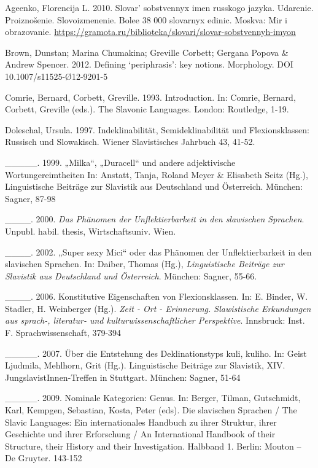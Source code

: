 \documentclass[output=paper]{langscibook}
\begin{document}
Ageenko, Florencija L. 2010. Slovar’ sobstvennyx imen russkogo jazyka. Udarenie. Proiznošenie. Slovoizmenenie. Bolee 38 000 slovarnyx edinic. Moskva: Mir i obrazovanie. \url{https://gramota.ru/biblioteka/slovari/slovar-sobstvennyh-imyon} 

Brown, Dunstan;  Marina  Chumakina;  Greville  Corbett;  Gergana  Popova  \& Andrew Spencer. 2012. Defining ‘periphrasis’: key notions. Morphology.  DOI 10.1007/s11525-Ø12-9201-5 

Comrie, Bernard, Corbett, Greville. 1993. Introduction. In: Comrie, Bernard, Corbett, Greville (eds.). The Slavonic Languages. London: Routledge, 1-19.

Doleschal, Ursula. 1997. Indeklinabilität, Semideklinabilität und Flexionsklassen: Russisch und Slowakisch. Wiener Slavistisches Jahrbuch 43, 41-52.

\_\_\_\_\_. 1999. „Milka“, „Duracell“ und andere adjektivische Wortungereimtheiten In: Anstatt, Tanja, Roland Meyer \& Elisabeth Seitz (Hg.), Linguistische Beiträge zur Slavistik aus Deutschland und Österreich. München: Sagner, 87-98

\_\_\_\_. 2000. \textit{Das Phänomen der Unflektierbarkeit in den slawischen Sprachen}. Unpubl. habil. thesis, Wirtschaftsuniv. Wien.

\_\_\_\_. 2002. „Super sexy Mici“ oder das Phänomen der Unflektierbarkeit in den slavischen Sprachen. In: Daiber, Thomas (Hg.), \textit{Linguistische Beiträge zur Slavistik aus Deutschland und Österreich}. München: Sagner, 55-66.

\_\_\_\_. 2006. Konstitutive Eigenschaften von Flexionsklassen. In: E. Binder, W. Stadler, H. Weinberger (Hg.). \textit{Zeit - Ort - Erinnerung. Slawistische Erkundungen aus sprach-, literatur- und kulturwissenschaftlicher Perspektive}. Innsbruck: Inst. F. Sprachwissenschaft, 379-394

\begin{styleBibliographie}
\_\_\_\_\_. 2007. Über die Entstehung des Deklinationstyps kuli, kuliho. In: Geist Ljudmila, Mehlhorn, Grit (Hg.). Linguistische Beiträge zur Slavistik, XIV. JungslavistInnen-Treffen in Stuttgart. München: Sagner, 51-64
\end{styleBibliographie}

\_\_\_\_\_. 2009. Nominale Kategorien: Genus. In: Berger, Tilman, Gutschmidt, Karl, Kempgen, Sebastian, Kosta, Peter (eds). Die slavischen Sprachen / The Slavic Languages: Ein internationales Handbuch zu ihrer Struktur, ihrer Geschichte und ihrer Erforschung / An International Handbook of their Structure, their History and their Investigation. Halbband 1. Berlin: Mouton – De Gruyter. 143-152
\end{document}
